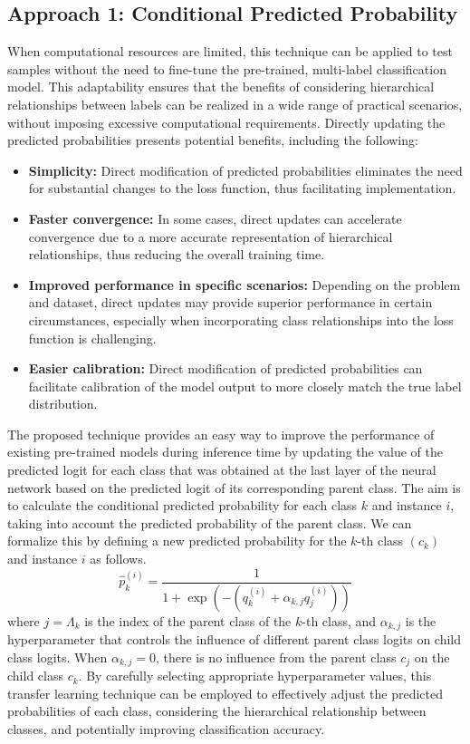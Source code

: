 \subsection{Approach 1: Conditional Predicted Probability}\label{subsec:taxonomy.method.approach1}
When computational resources are limited, this technique can be applied to test samples without the need to fine-tune the pre-trained, multi-label classification model. This adaptability ensures that the benefits of considering hierarchical relationships between labels can be realized in a wide range of practical scenarios, without imposing excessive computational requirements.
Directly updating the predicted probabilities presents potential benefits, including the following:
\begin{itemize}
    \item  \textbf{Simplicity:} Direct modification of predicted probabilities eliminates the need for substantial changes to the loss function, thus facilitating implementation.
    \item  \textbf{Faster convergence:} In some cases, direct updates can accelerate convergence due to a more accurate representation of hierarchical relationships, thus reducing the overall training time.
    \item  \textbf{Improved performance in specific scenarios:} Depending on the problem and dataset, direct updates may provide superior performance in certain circumstances, especially when incorporating class relationships into the loss function is challenging.
    \item  \textbf{Easier calibration:} Direct modification of predicted probabilities can facilitate calibration of the model output to more closely match the true label distribution.
\end{itemize}
The proposed technique provides an easy way to improve the performance of existing pre-trained models during inference time by updating the value of the predicted logit for each class that was obtained at the last layer of the neural network based on the predicted logit of its corresponding parent class. The aim is to calculate the conditional predicted probability for each class $k $ and instance $i $, taking into account the predicted probability of the parent class. We can formalize this by defining a new predicted probability for the $k$-th class $(c_k) $ and instance $i $ as follows.
\begin{equation}
    \widehat{p}_k^{(i)} = \frac{1}{ 1 + \exp \left(-\left(q_k^{(i)} + \alpha_{k,j} q_j^{(i)} \right)\right) }
    \label{eq:taxonomy.eq.1.pred.approach1}
\end{equation}
where $j=\Lambda_k$ is the index of the parent class of the $k$-th class, and $\alpha_{k,j} $ is the hyperparameter that controls the influence of different parent class logits on child class logits.
When $\alpha_{k,j}=0 $, there is no influence from the parent class $c_j$ on the child class $c_k$.  By carefully selecting appropriate hyperparameter values, this transfer learning technique can be employed to effectively adjust the predicted probabilities of each class, considering the hierarchical relationship between classes, and potentially improving classification accuracy.
